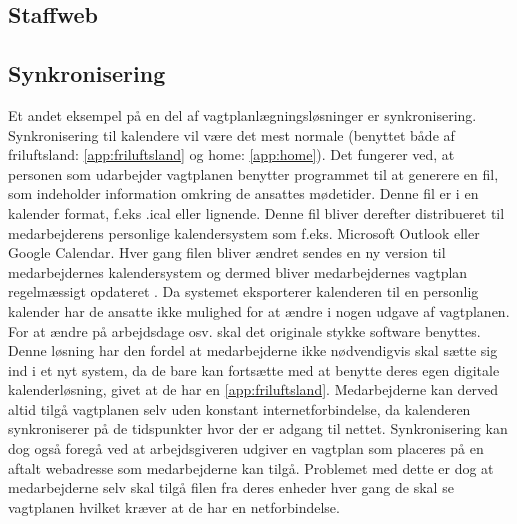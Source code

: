 \subsection{Staffweb}

\subsection{Synkronisering}
Et andet eksempel på en del af vagtplanlægningsløsninger er synkronisering. Synkronisering til kalendere vil være det mest normale (benyttet både af friluftsland: \ref{app:friluftsland} og home: \ref{app:home}). Det fungerer ved, at personen som udarbejder vagtplanen benytter programmet til at generere en fil, som indeholder information omkring de ansattes mødetider. Denne fil er i en kalender format, f.eks .ical eller lignende. Denne fil bliver derefter distribueret til medarbejderens personlige kalendersystem som f.eks. Microsoft Outlook eller Google Calendar. Hver gang filen bliver ændret sendes en ny version til medarbejdernes kalendersystem og dermed bliver medarbejdernes vagtplan regelmæssigt opdateret \citep{stage2005}. Da systemet eksporterer kalenderen til en personlig kalender har de ansatte ikke mulighed for at ændre i nogen udgave af vagtplanen. For at ændre på arbejdsdage osv. skal det originale stykke software benyttes. Denne løsning har den fordel at medarbejderne ikke nødvendigvis skal sætte sig ind i et nyt system, da de bare kan fortsætte med at benytte deres egen digitale kalenderløsning, givet at de har en \ref{app:friluftsland}. Medarbejderne kan derved altid tilgå vagtplanen selv uden konstant internetforbindelse, da kalenderen synkroniserer på de tidspunkter hvor der er adgang til nettet. Synkronisering kan dog også foregå ved at arbejdsgiveren udgiver en vagtplan som placeres på en aftalt webadresse som medarbejderne kan tilgå. Problemet med dette er dog at medarbejderne selv skal tilgå filen fra deres enheder hver gang de skal se vagtplanen hvilket kræver at de har en netforbindelse.\\

